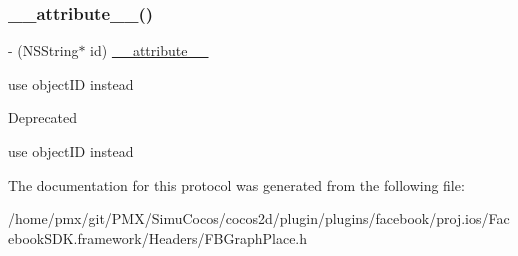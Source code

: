 \subsubsection{\texorpdfstring{\+\_\+\+\_\+attribute\+\_\+\+\_\+()}{\_\_attribute\_\_()}\hspace{0.1cm}{\footnotesize\ttfamily [5/5]}}
{\footnotesize\ttfamily -\/ (N\+S\+String$\ast$ id) \hyperlink{struct____attribute____}{\+\_\+\+\_\+attribute\+\_\+\+\_\+} \begin{DoxyParamCaption}\item[{((deprecated(\char`\"{}use object\+ID instead\char`\"{})))}]{ }\end{DoxyParamCaption}}

use object\+ID instead \begin{DoxyRefDesc}{Deprecated}
\item[\hyperlink{deprecated__deprecated000206}{Deprecated}]use object\+ID instead \end{DoxyRefDesc}


The documentation for this protocol was generated from the following file\+:\begin{DoxyCompactItemize}
\item 
/home/pmx/git/\+P\+M\+X/\+Simu\+Cocos/cocos2d/plugin/plugins/facebook/proj.\+ios/\+Facebook\+S\+D\+K.\+framework/\+Headers/F\+B\+Graph\+Place.\+h\end{DoxyCompactItemize}
